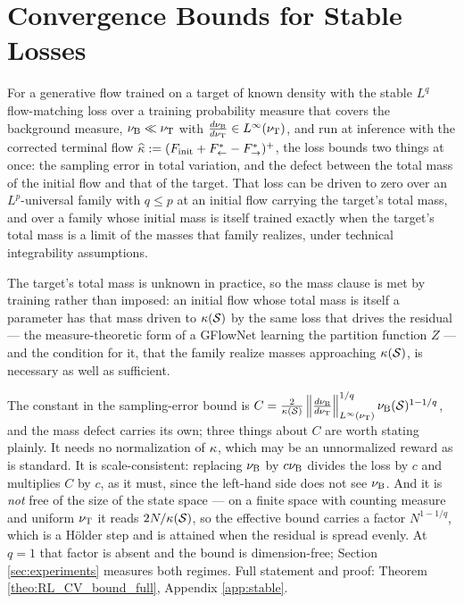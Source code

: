 \section{Convergence Bounds for Stable Losses}

 \begin{theorem}\label{theo:RL_CV_bound}
For a generative flow trained on a target of known density with the stable $L^q$
flow-matching loss over a training probability measure that covers the background measure,
$\nu_{\mathrm{B}}\ll\nu_{\mathrm{T}}$ with $\frac{d\nu_{\mathrm{B}}}{d\nu_{\mathrm{T}}}\in L^\infty(\nu_{\mathrm{T}})$, and run at inference with the corrected
terminal flow $\widehat{\kappa} := (F_{\mathrm{init}}+F^*_{\leftarrow}-F^*_{\rightarrow})^+$, the loss bounds two things
at once: the sampling error in total variation, and the defect between the total mass of the
initial flow and that of the target. That loss can be driven to zero over an $L^p$-universal
family with $q\leq p$ at an initial flow carrying the target's total mass, and over a family
whose initial mass is itself trained exactly when the target's total mass is a limit of the
masses that family realizes, under technical integrability assumptions.
\end{theorem}
The target's total mass is unknown in practice, so the mass clause is met by training rather
than imposed: an initial flow whose total mass is itself a parameter has that mass driven to
$\kappa(\mathcal S)$ by the same loss that drives the residual --- the measure-theoretic
form of a GFlowNet learning the partition function $Z$ --- and the condition for it, that the
family realize masses approaching $\kappa(\mathcal S)$, is necessary as well as sufficient.

The constant in the sampling-error bound is
$C=\frac{2}{\kappa(\mathcal S)}\left\|\frac{d\nu_{\mathrm{B}}}{d\nu_{\mathrm{T}}}\right\|^{1/q}_{L^\infty(\nu_{\mathrm{T}})}\nu_{\mathrm{B}}(\mathcal S)^{1-1/q}$,
and the mass defect carries its own; three things about $C$ are worth stating plainly. It
needs no normalization of $\kappa$, which may be an unnormalized reward as is standard. It
is scale-consistent: replacing
$\nu_{\mathrm{B}}$ by $c\nu_{\mathrm{B}}$ divides the loss by $c$ and multiplies $C$ by $c$, as it must, since
the left-hand side does not see $\nu_{\mathrm{B}}$. And it is \emph{not} free of the size of the state
space --- on a finite space with counting measure and uniform $\nu_{\mathrm{T}}$ it reads
$2N/\kappa(\mathcal S)$, so the effective bound carries a factor
$N^{1-1/q}$, which is a H\"older step and is attained when the residual is spread evenly.
At $q=1$ that factor is absent and the bound is dimension-free; Section \ref{sec:experiments}
measures both regimes. Full statement and proof: Theorem \ref{theo:RL_CV_bound_full},
Appendix \ref{app:stable}.

